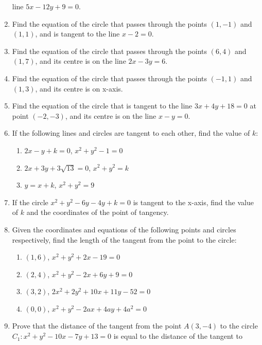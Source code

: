\documentclass{report}
\begin{document}
\begin{multicols}{2}
\begin{enumerate}
              line $5x - 12y + 9 = 0$.
        \item Find the equation of the circle that passes through the points $(1, -1)$ and
              $(1, 1)$, and is tangent to the line $x - 2 = 0$.
        \item Find the equation of the circle that passes through the points $(6, 4)$ and
              $(1, 7)$, and its centre is on the line $2x - 3y = 6$.
        \item Find the equation of the circle that passes through the points $(-1, 1)$ and
              $(1, 3)$, and its centre is on x-axis.
        \item Find the equation of the circle that is tangent to the line $3x + 4y + 18 = 0$
              at point $(-2, -3)$, and its centre is on the line $x - y = 0$.
        \item If the following lines and circles are tangent to each other, find the value of
              $k$:
              \begin{enumerate}
                  \item $2x - y + k = 0$, $x^2 + y^2 - 1 = 0$
                  \item $2x + 3y + 3\sqrt{13} = 0$, $x^2 + y^2 = k$
                  \item $y = x + k$, $x^2 + y^2 = 9$
              \end{enumerate}
        \item If the circle $x^2 + y^2 - 6y - 4y + k = 0$ is tangent to the x-axis, find the
              value of $k$ and the coordinates of the point of tangency.
        \item Given the coordinates and equations of the following points and circles
              respectively, find the length of the tangent from the point to the circle:
              \begin{enumerate}
                  \item $(1, 6)$, $x^2 + y^2 + 2x - 19 = 0$
                  \item $(2, 4)$, $x^2 + y^2 - 2x + 6y + 9 = 0$
                  \item $(3, 2)$, $2x^2 + 2y^2 + 10x + 11y - 52 = 0$
                  \item $(0, 0)$, $x^2 + y^2 - 2ax + 4ay + 4a^2 = 0$
              \end{enumerate}
        \item Prove that the distance of the tangent from the point $A(3, -4)$ to the circle
              $C_1: x^2 + y^2 - 10x - 7y + 13 = 0$ is equal to the distance of the tangent to

\end{enumerate}
\end{multicols}
\end{document}
